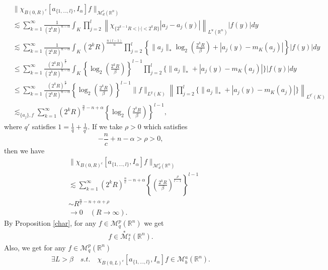 \documentclass[11pt,a4]{article}
\numberwithin{equation}{section}
\theoremstyle{definition}
\theoremstyle{remark}
\begin{document}
\begin{align*}
	&\| \chi_{{B(0,R)}^c} [a_{\{1, ... , l\}},I_{\alpha}]f \|_{{\mathcal M}^c_d({\mathbb R}^n)}\\
	&\lesssim \sum_{k=1}^{\infty} \frac{1}{(2^kR)^{n-\alpha}} \int_K \prod_{j=2}^{l} \left\| \chi_{{\{2^{k-1}R<|\cdot|<2^kR\}}} |a_j-a_j(y)| \right\|_{L^u({\mathbb R}^n)} |f(y)|dy\\
	&\lesssim \sum_{k=1}^{\infty} \frac{1}{(2^kR)^{n-\alpha}} \int_K (2^kR)^{\frac{n(l-1)}{u}}\prod_{j=2}^{l}\left\{\|a_j\|_* \log_2\left(\frac{2^kR}{\beta}\right)+|a_j(y)-m_K(a_j)|\right\} |f(y)|dy\\
    	&\le \sum_{k=1}^{\infty} \frac{(2^kR)^{\frac{n}{c}}}{(2^kR)^{n-\alpha}} \int_K \left\{\log_2\left(\frac{2^kR}{\beta}\right)\right\}^{l-1} \prod_{j=2}^{l}\Big\{\|a_j\|_* +|a_j(y)-m_K(a_j)|\Big\} |f(y)|dy\\
	&\le \sum_{k=1}^{\infty} \frac{(2^kR)^{\frac{n}{c}}}{(2^kR)^{n-\alpha}} \left\{\log_2\left(\frac{2^kR}{\beta}\right)\right\}^{l-1} \|f\|_{L^q(K)} \left\|\prod_{j=2}^{l}\{\|a_j\|_* +|a_j(y)-m_K(a_j)|\}\right\|_{L^{q'}(K)}\\
	&\lesssim_{\{a_j\},f} \sum_{k=1}^{\infty} (2^kR)^{\frac{n}{c}-n+\alpha} \left\{\log_2\left(\frac{2^kR}{\beta}\right)\right\}^{l-1},
\end{align*}
where $q'$ satisfies $1=\frac{1}{q}+\frac{1}{q'}$. 
If we take $\rho>0$ which satisfies
\[
	-\frac{n}{c}+n-\alpha > \rho > 0,
\]
then we have
\begin{align*}
	&\| \chi_{{B(0,R)}^c} [a_{\{1, ... , l\}},I_{\alpha}]f \|_{{\mathcal M}^c_d({\mathbb R}^n)}\\
	&\lesssim \sum_{k=1}^{\infty} (2^kR)^{\frac{n}{c}-n+\alpha} \left\{\left(\frac{2^kR}{\beta}\right)^{\frac{\rho}{l-1}}\right\}^{l-1}\\
	&\sim R^{\frac{n}{c}-n+\alpha+\rho}\\
	&\rightarrow 0 \quad (R \rightarrow \infty).
\end{align*}
By Proposition \ref{char}, for any $f \in {\mathcal M}^{p}_q({\mathbb R}^n)$ we get
\begin{align*}
	[a_{\{1, ... , l\}},I_{\alpha}]f \in \overset{*}{\mathcal M}{}^s_t({\mathbb R}^n).
\end{align*}
Also, we get for any $f \in {\mathcal M}^{p}_q({\mathbb R}^n)$
\begin{align}\label{A}
	\exists L > \beta \quad s.t. \quad \chi_{B(0,L)^c}[a_{\{1, ... , l\}},I_{\alpha}]f \in {\mathcal M}{}^a_b({\mathbb R}^n).
\end{align}
\end{document}
